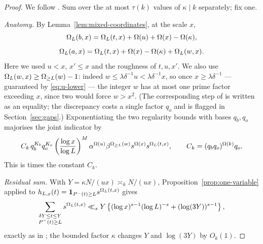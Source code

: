 \documentclass[11pt]{article}
\begin{document}
\begin{proof}
We follow \cite[Prop.~5.2]{DellaPietra2026}. Sum over the at most
\(\tau(k)\) values of \(\kappa\mid k\) separately; fix one.

\emph{Anatomy.} By Lemma~\ref{lem:mixed-coordinates}, at the scale \(x\),
\[
 \Omega_L(b,x)=\Omega_L(t,x)+\Omega(u)+\Omega(x)-\Omega(\kappa),
\]
\[
 \Omega_L(a,x)=\Omega_L(t,x)+\Omega(x)-\Omega(\kappa)+\Omega_L(w,x).
\]
Here we used \(u<x\), \(x'\leq x\) and the roughness of \(t,u,x'\). We also
use \(\Omega_L(w,x)\geq\Omega_{\geq L}(w)-1\): indeed
\(w\leq\lambda\delta^{-1}u<\lambda\delta^{-1}x\), so once
\(x\geq\lambda\delta^{-1}\) --- guaranteed by \eqref{eq:u-lower} --- the
integer \(w\) has at most one prime factor exceeding \(x\), since two would
force \(w>x^2\). (The corresponding step of \cite{DellaPietra2026} is written as an
equality; the discrepancy costs a single factor \(q_o\) and is flagged in
Section~\ref{sec:gaps}.) Exponentiating the two regularity bounds with bases
\(q_b,q_o\) majorises the joint indicator by
\begin{equation}\label{eq:mixed-indicator}
 C_k\,q_b^{K_b}q_o^{K_o}
 \left(\frac{\log x}{\log L}\right)^{M}
 \alpha^{\Omega(u)}\beta^{\Omega_{\geq L}(w)}s^{\Omega(x)}s^{\Omega_L(t,x)},
 \qquad C_k=(q_bq_o)^{\Omega(k)}q_o .
\end{equation}
This is \cite[(5.4)]{DellaPietra2026} times the constant \(C_k\).

\emph{Residual sum.} With \(Y=\kappa N/(ux)\asymp_{k}N/(ux)\),
Proposition~\ref{prop:one-variable} applied to
\(h_{L,x}(t)=\mathbf 1_{P^-(t)\geq L}s^{\Omega_L(t,x)}\) gives
\begin{equation}\label{eq:mixed-residual}
 \sum_{\substack{\delta Y\leq t\leq Y\\P^-(t)\geq L}}s^{\Omega_L(t,x)}
 \ll_{s}Y\left\{(\log x)^{s-1}(\log L)^{-s}+(\log(3Y))^{s-1}\right\},
\end{equation}
exactly as in \cite[(5.5)]{DellaPietra2026}; the bounded factor \(\kappa\)
changes \(Y\) and \(\log(3Y)\) by \(O_k(1)\).


\end{proof}
\end{document}
